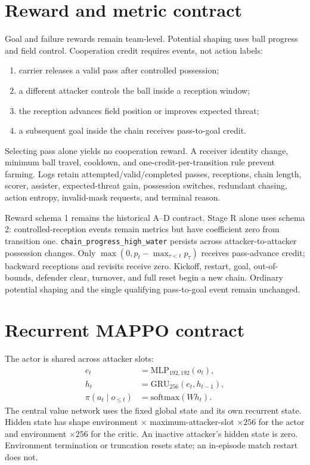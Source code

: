 \documentclass[12pt,twocolumn]{article}
\begin{document}
\section{Reward and metric contract}
Goal and failure rewards remain team-level. Potential shaping uses ball progress and field control.
Cooperation credit requires events, not action labels:
\begin{enumerate}
\item carrier releases a valid pass after controlled possession;
\item a different attacker controls the ball inside a reception window;
\item the reception advances field position or improves expected threat;
\item a subsequent goal inside the chain receives pass-to-goal credit.
\end{enumerate}
Selecting pass alone yields no cooperation reward. A receiver identity change, minimum ball travel,
cooldown, and one-credit-per-transition rule prevent farming. Logs retain attempted/valid/completed
passes, receptions, chain length, scorer, assister, expected-threat gain, possession switches,
redundant chasing, action entropy, invalid-mask requests, and terminal reason.

Reward schema 1 remains the historical A--D contract. Stage R alone uses schema 2:
controlled-reception events remain metrics but have coefficient zero from transition one.
\texttt{chain\_progress\_high\_water} persists across attacker-to-attacker possession changes.
Only \(\max(0,p_t-\max_{\tau<t}p_\tau)\) receives pass-advance credit; backward receptions and
revisits receive zero. Kickoff, restart, goal, out-of-bounds, defender clear, turnover, and full
reset begin a new chain. Ordinary potential shaping and the single qualifying pass-to-goal event
remain unchanged.

\section{Recurrent MAPPO contract}
The actor is shared across attacker slots:
\[
\begin{aligned}
e_t &= \mathrm{MLP}_{192,192}(o_t),\\
h_t &= \mathrm{GRU}_{256}(e_t,h_{t-1}),\\
\pi(a_t\mid o_{\leq t}) &= \mathrm{softmax}(W h_t).
\end{aligned}
\]
The central value network uses the fixed global state and its own recurrent state. Hidden state has
shape environment $\times$ maximum-attacker-slot $\times256$ for the actor and environment
$\times256$ for the critic. An inactive attacker's hidden state is zero. Environment termination
or truncation resets state; an in-episode match restart does not.
\end{document}
